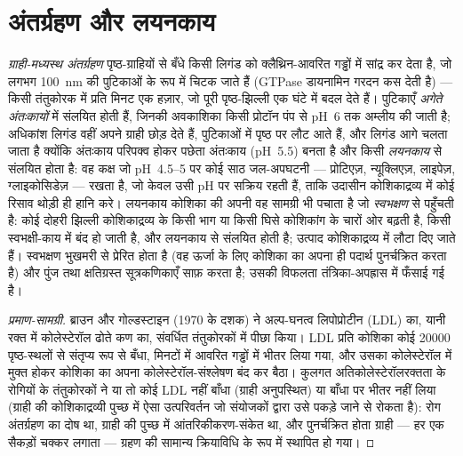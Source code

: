\section{अंतर्ग्रहण और लयनकाय}

\begin{definition}[अंतर्ग्रहण]\label{def:b3:membrane-traffic:endocytosis}
\emph{ग्राही-मध्यस्थ अंतर्ग्रहण} पृष्ठ-ग्राहियों से बँधे किसी लिगंड को
क्लैथ्रिन-आवरित गड्ढों में सांद्र कर देता है, जो लगभग \qty{100}{nm} की
पुटिकाओं के रूप में चिटक जाते हैं (GTPase डायनामिन गरदन कस देती है)
--- किसी तंतुकोरक में प्रति मिनट एक हज़ार, जो पूरी पृष्ठ-झिल्ली एक घंटे
में बदल देते हैं। पुटिकाएँ \emph{अगेते
अंतःकायों} में संलयित होती हैं, जिनकी अवकाशिका किसी प्रोटॉन पंप से
pH~6 तक अम्लीय की जाती है; अधिकांश लिगंड वहीं अपने ग्राही छोड़ देते
हैं,  पुटिकाओं में पृष्ठ पर लौट आते हैं, और लिगंड आगे
चलता जाता है क्योंकि अंतःकाय परिपक्व होकर पछेता अंतःकाय (pH~5.5) बनता
है और किसी \emph{लयनकाय} से संलयित होता है: वह कक्ष जो pH~4.5--5 पर
कोई साठ जल-अपघटनी --- प्रोटिएज़, न्यूक्लिएज़, लाइपेज़, ग्लाइकोसिडेज़
--- रखता है, जो केवल उसी pH पर सक्रिय रहती हैं, ताकि उदासीन
कोशिकाद्रव्य में कोई रिसाव थोड़ी ही हानि करे। लयनकाय कोशिका की अपनी वह
सामग्री भी पचाता है जो \emph{स्वभक्षण} से पहुँचती है: कोई दोहरी झिल्ली
कोशिकाद्रव्य के किसी भाग या किसी घिसे कोशिकांग के चारों ओर बढ़ती है,
किसी स्वभक्षी-काय में बंद हो जाती है, और लयनकाय से संलयित होती है;
उत्पाद कोशिकाद्रव्य में लौटा दिए जाते हैं। स्वभक्षण भुखमरी से प्रेरित
होता है (वह ऊर्जा के लिए कोशिका का अपना ही पदार्थ पुनर्चक्रित करता है)
और पुंज तथा क्षतिग्रस्त सूत्रकणिकाएँ साफ़ करता है; उसकी विफलता
तंत्रिका-अपह्रास में फँसाई गई है।
\end{definition}

\begin{proof}[प्रमाण-सामग्री]
ब्राउन और गोल्डस्टाइन (1970 के दशक) ने अल्प-घनत्व लिपोप्रोटीन (LDL) का,
यानी रक्त में कोलेस्टेरॉल ढोते कण का, संवर्धित तंतुकोरकों में पीछा
किया। LDL प्रति कोशिका कोई \num{20000} पृष्ठ-स्थलों से संतृप्य रूप से
बँधा, मिनटों में आवरित गड्ढों में भीतर लिया गया, और उसका
कोलेस्टेरॉल  में मुक्त होकर कोशिका का अपना
कोलेस्टेरॉल-संश्लेषण बंद कर बैठा। कुलगत अतिकोलेस्टेरॉलरक्तता के
रोगियों के तंतुकोरकों ने या तो कोई LDL नहीं बाँधा (ग्राही अनुपस्थित) या
बाँधा पर भीतर नहीं लिया (ग्राही की कोशिकाद्रव्यी पुच्छ में ऐसा
उत्परिवर्तन जो  संयोजकों द्वारा उसे पकड़े जाने से रोकता है):
रोग अंतर्ग्रहण का दोष था, ग्राही की पुच्छ में आंतरिकीकरण-संकेत था, और
पुनर्चक्रित होता ग्राही --- हर एक सैकड़ों चक्कर लगाता --- ग्रहण की
सामान्य क्रियाविधि के रूप में स्थापित हो गया।
\end{proof}

